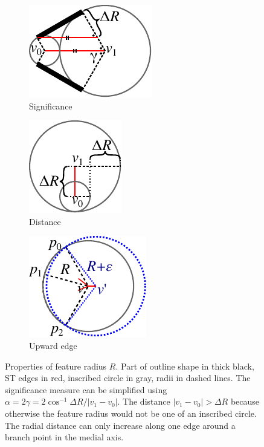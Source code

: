 \begin{figure} \centering
\newlength{\significancePropertiesHeight}
\setlength{\significancePropertiesHeight}{.25\columnwidth}
\begin{subfigure}{0.35\columnwidth} \centering
\includegraphics[height=\significancePropertiesHeight]{sources/method/distance_based_angles.pdf}
\caption{Significance}
\label{distance_based_angles}
\end{subfigure}
\begin{subfigure}{0.3\columnwidth} \centering
\includegraphics[height=\significancePropertiesHeight]{sources/method/distance_ratio_limit.pdf}
\caption{Distance}
\label{distance_ratio_limit}
\end{subfigure}
\begin{subfigure}{0.3\columnwidth} \centering
\includegraphics[height=\significancePropertiesHeight]{sources/method/branch_upward_edge_property.pdf}
\caption{Upward edge}
\label{branch_upward_edge_property}
\end{subfigure}
\caption{
Properties of feature radius $R$.
Part of outline shape in thick black,
ST edges in red,
inscribed circle in gray,
radii in dashed lines.
 The significance measure can be simplified using $\alpha = 2 \gamma = 2 \cos^{-1} \Delta R / |v_1 - v_0|$.
 The distance $|v_1 - v_0| > \Delta R$ because otherwise the feature radius would not be one of an inscribed circle.
 The radial distance can only increase along one edge around a branch point in the medial axis.
}
\end{figure}




